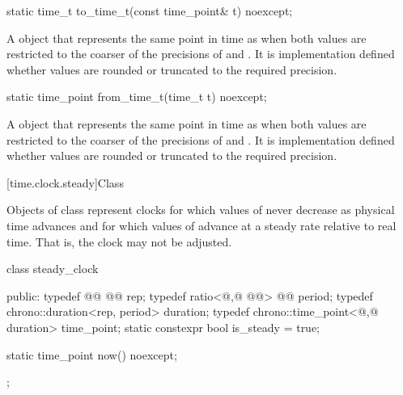%
\begin{itemdecl}
static time_t to_time_t(const time_point& t) noexcept;
\end{itemdecl}

\begin{itemdescr}
\pnum
\returns A  object that represents the same point in time as 
when both values are restricted to the coarser of the precisions of  and
.
It is implementation defined whether values are rounded or truncated to the
required precision.
\end{itemdescr}

%
\begin{itemdecl}
static time_point from_time_t(time_t t) noexcept;
\end{itemdecl}

\begin{itemdescr}
\pnum
\returns A  object that represents the same point in time as 
when both values are restricted to the coarser of the precisions of  and
.
It is implementation defined whether values are rounded or truncated to the
required precision.
\end{itemdescr}

[time.clock.steady]{Class }

\pnum
Objects of class  represent clocks for which values of 
never decrease as physical time advances and for which values of  advance at
a steady rate relative to real time. That is, the clock may not be adjusted.

\begin{codeblock}
class steady_clock {
public:
  typedef @\unspec{}@                      @\itcorr[-1]@         rep;
  typedef ratio<@\unspecnc,@ @\unspec{}@>  @\itcorr[-1]@         period;
  typedef chrono::duration<rep, period>             duration;
  typedef chrono::time_point<@\unspecnc,@ duration> time_point;
  static constexpr bool is_steady =                 true;

  static time_point now() noexcept;
};
\end{codeblock}

